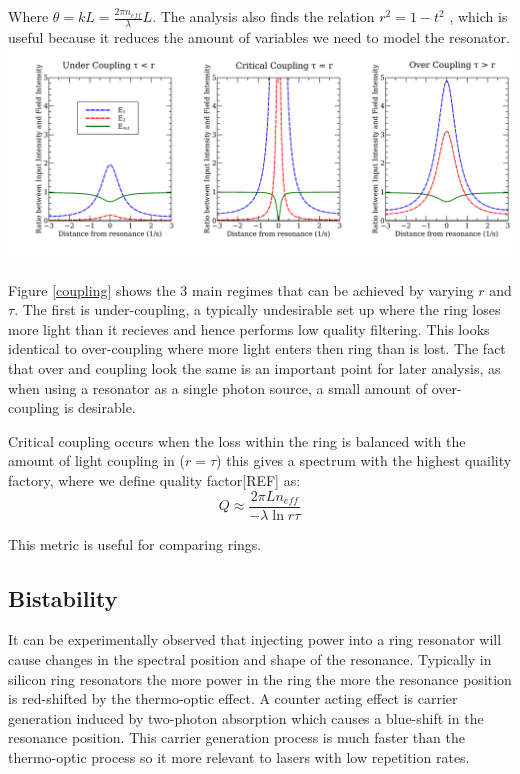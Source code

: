 Where $\theta=kL=\frac{2\pi n_{eff}}{\lambda}L$. The analysis also finds the relation $r^2 = 1 - t^2$ , which is useful because it reduces the amount of variables we need to model the resonator.
\begingroup
    \centering  
    \includegraphics[width=17cm]{img/theory/coupling.pdf}
     \vspace{3pt} \label{coupling}
\endgroup

Figure \ref{coupling} shows the 3 main regimes that can be achieved by varying $r$ and $\tau$. The first is under-coupling, a typically undesirable set up where the ring loses more light than it recieves and hence performs low quality filtering. This looks identical to over-coupling where more light enters then ring than is lost. The fact that over and coupling look the same is an important point for later analysis, as when using a resonator as a single photon source, a small amount of over-coupling is desirable. 

Critical coupling occurs when the loss within the ring is balanced with the amount of light coupling in ($r=\tau$) this gives a spectrum with the highest quaility factory, where we define quality factor[REF] as:
\begin{equation}
Q \approx \frac{2\pi L n_{eff}}{-\lambda \ln{r\tau}}
\end{equation}

This metric is useful for comparing rings. 

\subsection{Bistability}
It can be experimentally observed that injecting power into a ring resonator will cause changes in the spectral position and shape of the resonance. Typically in silicon ring resonators the more power in the ring the more the resonance position is red-shifted by the thermo-optic effect\cite{almeida_optical_2004-1}. A counter acting effect is carrier generation induced by two-photon absorption \cite{xu_carrier-induced_2006} which causes a blue-shift in the resonance position. This carrier generation process is much faster than the thermo-optic process so it more relevant to lasers with low repetition rates. 

